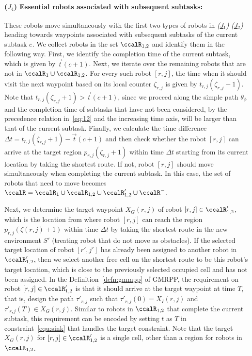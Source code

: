 \documentclass[Afour,sageh,times]{sagej}
\begin{document}
{{ \paragraph{($J_4$) Essential robots associated with subsequent subtasks:} These robots move simultaneously with the first two types of robots in {\it (\hyperref[sec:essential_a]{J$_1$})}-{\it (\hyperref[sec:essential_b]{J$_2$})} heading towards  waypoints associated with subsequent subtasks of the current subtask $e$. We collect robots in the set $\ccalR_{1,2}$ and identify them in the following way. First, we identify the completion time  of the current subtask, which is given by $\vec{t}(c+1)$.  Next, we iterate over the remaining robots that are not in $\ccalR_1 \cup \ccalR_{1,2}$. For every such robot $[r,j]$, the time when it should visit the next waypoint based on its local counter $\zeta_{r,j}$ is given by $t_{r,j}(\zeta_{r,j}+1)$. Note that {$t_{r, j}(\zeta_{r,j}+1) > \vec{t}(c+1)$}, since we proceed along the simple path $\theta_{\phi}$ and the completion time of  subtasks that have not been considered, by the precedence relation in~\eqref{eq:12} and the increasing time axis, will be larger than that of the current subtask. Finally, we calculate the time difference $\Delta t = t_{r, j}(\zeta_{r,j}+1) - \vec{t}(c+1)$  and then check whether the robot $[r, j]$ can arrive at the target region $p_{r,j}(\zeta_{r,j}+1)$  within time $\Delta t$ starting from  its current location by taking the shortest route. {If not, robot $[r, j]$ should move simultaneously when completing the current subtask.} In this case, the set of robots that need to move becomes $\ccalR = \ccalR_1 \cup \ccalR_{1,2} \cup \ccalR'_{1,2}\cup \ccalR^-$.

 Next, we determine the target waypoint $X_G(r,j)$ of robot $[r,j] \in \ccalR'_{1,2}$, which is the  location from where robot $[r,j]$ can reach the region $p_{r,j}(\zeta(r,j)+1)$ within time $\Delta t$ by taking the shortest route in the new environment $S'$ (treating robot that do not move as obstacles). If the selected target location of robot $[r',j']$ has already been assigned to another robot in $\ccalR'_{1,2}$, then we select another free cell on the shortest route to be this robot's target location, which is close to the previously selected occupied cell and has not been assigned. In the Definition~\ref{defn:gmmpp} of GMRPP, the requirement on robot $[r,j] \in \ccalR'_{1,2}$ is that it should arrive at the target waypoint at time $T$, that is, design the path $\tau'_{r,j}$ such that $\tau'_{r,j}(0) = X_I(r,j)$ and $\tau'_{r,j}(T) \in X_G(r,j)$.  Similar to robots in $\ccalR_{1,2}$ that complete the current subtask, this requirement can be encoded by setting $t$ as $T$ in constraint~\eqref{equ:sink} that handles the target constraint. Note that the target $X_G(r,j)$ for $[r,j] \in \ccalR_{1,2}'$ is a single cell, other than a region for robots in $\ccalR_{1,2}$.

}}
\end{document}
